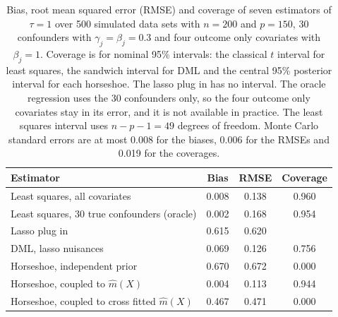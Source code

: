 \begin{table}[ht]
\centering
\small
\caption{Bias, root mean squared error (RMSE) and coverage of seven estimators of $\tau = 1$ over 500 simulated data sets with $n = 200$ and $p = 150$, 30 confounders with $\gamma_j = \beta_j = 0.3$ and four outcome only covariates with $\beta_j = 1$. Coverage is for nominal 95\% intervals: the classical $t$ interval for least squares, the sandwich interval for DML and the central 95\% posterior interval for each horseshoe. The lasso plug in has no interval. The oracle regression uses the 30 confounders only, so the four outcome only covariates stay in its error, and it is not available in practice. The least squares interval uses $n - p - 1 = 49$ degrees of freedom. Monte Carlo standard errors are at most 0.008 for the biases, 0.006 for the RMSEs and 0.019 for the coverages.}
\label{tab:ric_weak30}
\begin{tabular}{@{}>{\raggedright\arraybackslash}p{2.3in}ccc@{}}
\toprule
Estimator & Bias & RMSE & Coverage \\
\midrule
Least squares, all covariates & 0.008 & 0.138 & 0.960 \\
Least squares, 30 true confounders (oracle) & 0.002 & 0.168 & 0.954 \\
Lasso plug in & 0.615 & 0.620 &  \\
DML, lasso nuisances & 0.069 & 0.126 & 0.756 \\
Horseshoe, independent prior & 0.670 & 0.672 & 0.000 \\
Horseshoe, coupled to $\hat m(X)$ & 0.004 & 0.113 & 0.944 \\
Horseshoe, coupled to cross fitted $\hat m(X)$ & 0.467 & 0.471 & 0.000 \\
\bottomrule
\end{tabular}
\end{table}
